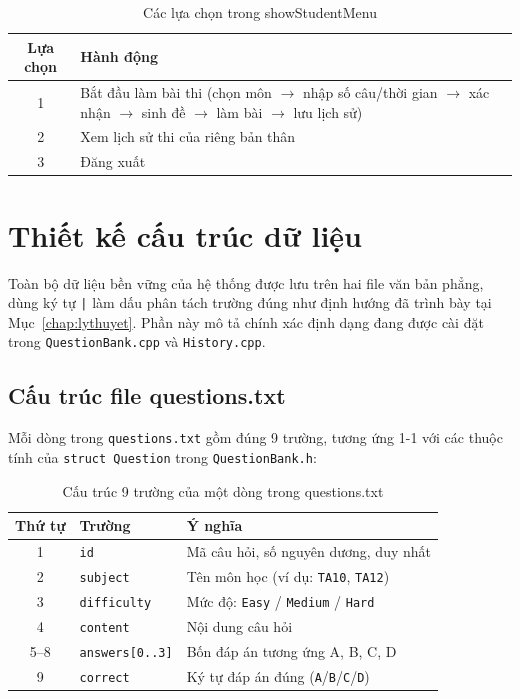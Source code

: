 \documentclass[11pt]{report}
\begin{document}
\begin{table}[H]
    \centering
    \begin{tabularx}{\textwidth}{|c|X|} \hline
        \textbf{Lựa chọn} & \textbf{Hành động} \\ \hline
        1 & Bắt đầu làm bài thi (chọn môn $\to$ nhập số câu/thời gian $\to$ xác nhận $\to$ sinh đề $\to$ làm bài $\to$ lưu lịch sử) \\ \hline
        2 & Xem lịch sử thi của riêng bản thân  \\ \hline
        3 & Đăng xuất \\ \hline
    \end{tabularx}
    \caption{Các lựa chọn trong showStudentMenu}
    \label{tab:studentflow}
\end{table}

\section{Thiết kế cấu trúc dữ liệu}

Toàn bộ dữ liệu bền vững của hệ thống được lưu trên hai file văn bản phẳng, dùng ký tự \texttt{|} làm dấu phân tách trường đúng như định hướng đã trình bày tại Mục~\ref{chap:lythuyet}. Phần này mô tả chính xác định dạng đang được cài đặt trong \texttt{QuestionBank.cpp} và \texttt{History.cpp}.

\subsection{Cấu trúc file questions.txt}

Mỗi dòng trong \texttt{questions.txt} gồm đúng 9 trường, tương ứng 1-1 với các thuộc tính của \texttt{struct Question} trong \texttt{QuestionBank.h}:

\begin{table}[H]
    \centering
    \begin{tabularx}{\textwidth}{|c|l|X|} \hline
        \textbf{Thứ tự} & \textbf{Trường} & \textbf{Ý nghĩa} \\ \hline
        1 & \texttt{id} & Mã câu hỏi, số nguyên dương, duy nhất \\ \hline
        2 & \texttt{subject} & Tên môn học (ví dụ: \texttt{TA10}, \texttt{TA12}) \\ \hline
        3 & \texttt{difficulty} & Mức độ: \texttt{Easy} / \texttt{Medium} / \texttt{Hard} \\ \hline
        4 & \texttt{content} & Nội dung câu hỏi \\ \hline
        5--8 & \texttt{answers[0..3]} & Bốn đáp án tương ứng A, B, C, D \\ \hline
        9 & \texttt{correct} & Ký tự đáp án đúng (\texttt{A}/\texttt{B}/\texttt{C}/\texttt{D}) \\ \hline
    \end{tabularx}
    \caption{Cấu trúc 9 trường của một dòng trong questions.txt}
    \label{tab:questions_format}
\end{table}
\end{document}
